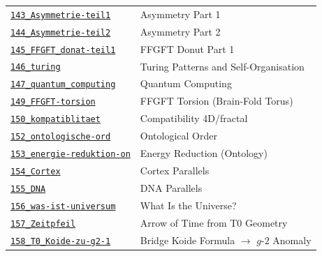 {\begin{longtable}{@{}>{\raggedright\arraybackslash}p{} >{\raggedright\arraybackslash}p{}@{}}
\href{https://github.com/jpascher/T0-Time-Mass-Duality/blob/main/2/pdf/143_Asymmetrie-teil1_De.pdf}{\texttt{143\_Asymmetrie-teil1}} & Asymmetry Part 1 \\
\href{https://github.com/jpascher/T0-Time-Mass-Duality/blob/main/2/pdf/144_Asymmetrie-teil2_De.pdf}{\texttt{144\_Asymmetrie-teil2}} & Asymmetry Part 2 \\
\href{https://github.com/jpascher/T0-Time-Mass-Duality/blob/main/2/pdf/145_FFGFT_donat-teil1_De.pdf}{\texttt{145\_FFGFT\_donat-teil1}} & FFGFT Donut Part 1 \\
\href{https://github.com/jpascher/T0-Time-Mass-Duality/blob/main/2/pdf/146_turing_De.pdf}{\texttt{146\_turing}} & Turing Patterns and Self-Organisation \\
\href{https://github.com/jpascher/T0-Time-Mass-Duality/blob/main/2/pdf/147_quantum_computing_De.pdf}{\texttt{147\_quantum\_computing}} & Quantum Computing \\
\href{https://github.com/jpascher/T0-Time-Mass-Duality/blob/main/2/pdf/149_FFGFT-torsion_De.pdf}{\texttt{149\_FFGFT-torsion}} & FFGFT Torsion (Brain-Fold Torus) \\
\href{https://github.com/jpascher/T0-Time-Mass-Duality/blob/main/2/pdf/150_kompatiblitaet_De.pdf}{\texttt{150\_kompatiblitaet}} & Compatibility 4D/fractal \\
\href{https://github.com/jpascher/T0-Time-Mass-Duality/blob/main/2/pdf/152_ontologische-ord_De.pdf}{\texttt{152\_ontologische-ord}} & Ontological Order \\
\href{https://github.com/jpascher/T0-Time-Mass-Duality/blob/main/2/pdf/153_energie-reduktion-on_De.pdf}{\texttt{153\_energie-reduktion-on}} & Energy Reduction (Ontology) \\
\href{https://github.com/jpascher/T0-Time-Mass-Duality/blob/main/2/pdf/154_Cortex_De.pdf}{\texttt{154\_Cortex}} & Cortex Parallels \\
\href{https://github.com/jpascher/T0-Time-Mass-Duality/blob/main/2/pdf/155_DNA_De.pdf}{\texttt{155\_DNA}} & DNA Parallels \\
\href{https://github.com/jpascher/T0-Time-Mass-Duality/blob/main/2/pdf/156_was-ist-universum_En.pdf}{\texttt{156\_was-ist-universum}} & What Is the Universe? \\
\href{https://github.com/jpascher/T0-Time-Mass-Duality/blob/main/2/pdf/157_Zeitpfeil_En.pdf}{\texttt{157\_Zeitpfeil}} & Arrow of Time from T0 Geometry \\
\href{https://github.com/jpascher/T0-Time-Mass-Duality/blob/main/2/pdf/158_T0_Koide-zu-g2-1_En.pdf}{\texttt{158\_T0\_Koide-zu-g2-1}} & Bridge Koide Formula $\to$ $g$-$2$ Anomaly \\

\end{longtable}}

